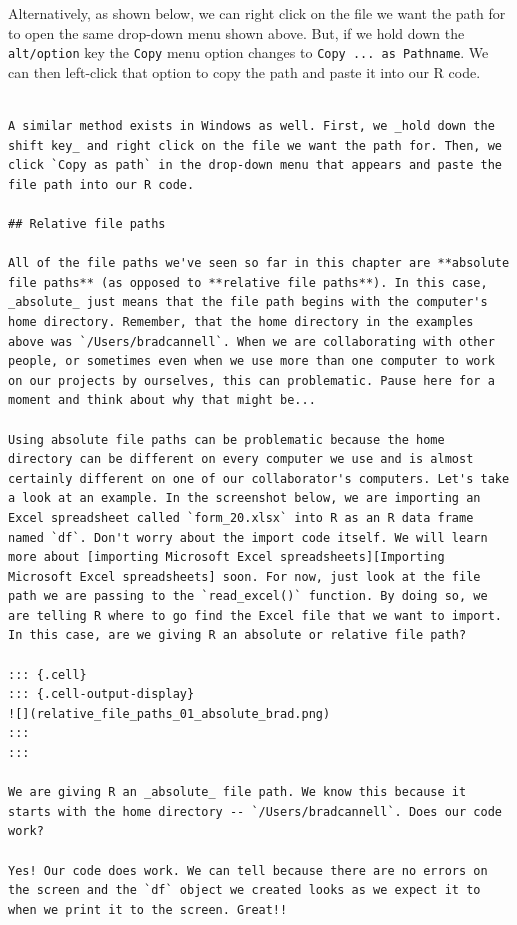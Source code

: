 \documentclass[
  letterpaper,
  DIV=11,
  numbers=noendperiod]{scrreprt}
\begin{document}
Alternatively, as shown below, we can right click on the file we want
the path for to open the same drop-down menu shown above. But, if we
hold down the \texttt{alt/option} key the \texttt{Copy} menu option
changes to \texttt{Copy\ ...\ as\ Pathname}. We can then left-click that
option to copy the path and paste it into our R code.

\begin{verbatim}

A similar method exists in Windows as well. First, we _hold down the shift key_ and right click on the file we want the path for. Then, we click `Copy as path` in the drop-down menu that appears and paste the file path into our R code.

## Relative file paths

All of the file paths we've seen so far in this chapter are **absolute file paths** (as opposed to **relative file paths**). In this case, _absolute_ just means that the file path begins with the computer's home directory. Remember, that the home directory in the examples above was `/Users/bradcannell`. When we are collaborating with other people, or sometimes even when we use more than one computer to work on our projects by ourselves, this can problematic. Pause here for a moment and think about why that might be...

Using absolute file paths can be problematic because the home directory can be different on every computer we use and is almost certainly different on one of our collaborator's computers. Let's take a look at an example. In the screenshot below, we are importing an Excel spreadsheet called `form_20.xlsx` into R as an R data frame named `df`. Don't worry about the import code itself. We will learn more about [importing Microsoft Excel spreadsheets][Importing Microsoft Excel spreadsheets] soon. For now, just look at the file path we are passing to the `read_excel()` function. By doing so, we are telling R where to go find the Excel file that we want to import. In this case, are we giving R an absolute or relative file path?

::: {.cell}
::: {.cell-output-display}
![](relative_file_paths_01_absolute_brad.png)
:::
:::

We are giving R an _absolute_ file path. We know this because it starts with the home directory -- `/Users/bradcannell`. Does our code work? 

Yes! Our code does work. We can tell because there are no errors on the screen and the `df` object we created looks as we expect it to when we print it to the screen. Great!!


\end{verbatim}
\end{document}
